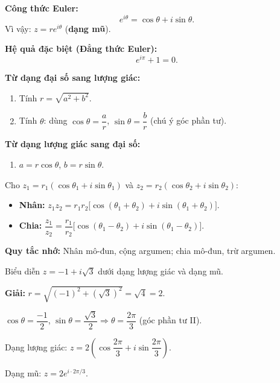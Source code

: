 \documentclass[12pt,a4paper]{article}
\begin{document}
\begin{dinhnghia}[title={Công thức Euler và dạng mũ}]
  \textbf{Công thức Euler:}
  \[
    e^{i\theta} = \cos\theta + i\sin\theta.
  \]
  Vì vậy: $z = r e^{i\theta}$ (\textbf{dạng mũ}).

  \textbf{Hệ quả đặc biệt (Đẳng thức Euler):}
  \[
    e^{i\pi} + 1 = 0.
  \]
\end{dinhnghia}

\begin{phuongphap}[title={Chuyển đổi giữa các dạng biểu diễn}]
  \textbf{Từ dạng đại số sang lượng giác:}
  \begin{enumerate}
    \item Tính $r = \sqrt{a^2 + b^2}$.
    \item Tính $\theta$: dùng $\cos\theta = \dfrac{a}{r}$, $\sin\theta = \dfrac{b}{r}$ (chú ý góc phần tư).
  \end{enumerate}

  \textbf{Từ dạng lượng giác sang đại số:}
  \begin{enumerate}
    \item $a = r\cos\theta$, $b = r\sin\theta$.
  \end{enumerate}
\end{phuongphap}

\begin{congthuc}[title={Nhân và chia dưới dạng lượng giác}]
  Cho $z_1 = r_1(\cos\theta_1 + i\sin\theta_1)$ và $z_2 = r_2(\cos\theta_2 + i\sin\theta_2)$:
  \begin{itemize}
    \item \textbf{Nhân:} $z_1 z_2 = r_1 r_2 \bigl[\cos(\theta_1 + \theta_2) + i\sin(\theta_1 + \theta_2)\bigr]$.
    \item \textbf{Chia:} $\dfrac{z_1}{z_2} = \dfrac{r_1}{r_2}\bigl[\cos(\theta_1 - \theta_2) + i\sin(\theta_1 - \theta_2)\bigr]$.
  \end{itemize}
  \textbf{Quy tắc nhớ:} Nhân mô-đun, cộng argumen; chia mô-đun, trừ argumen.
\end{congthuc}

\begin{vidu}
  Biểu diễn $z = -1 + i\sqrt{3}$ dưới dạng lượng giác và dạng mũ.

  \medskip\textbf{Giải:}
  $r = \sqrt{(-1)^2 + (\sqrt{3})^2} = \sqrt{4} = 2$.

  $\cos\theta = \dfrac{-1}{2}$, $\sin\theta = \dfrac{\sqrt{3}}{2} \Rightarrow \theta = \dfrac{2\pi}{3}$ (góc phần tư II).

  Dạng lượng giác: $z = 2\!\left(\cos\dfrac{2\pi}{3} + i\sin\dfrac{2\pi}{3}\right)$.

  Dạng mũ: $z = 2e^{i\cdot 2\pi/3}$.
\end{vidu}
\end{document}

